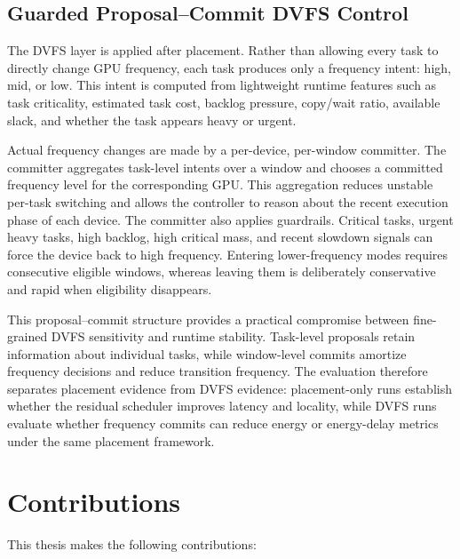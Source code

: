 \subsection{Guarded Proposal--Commit DVFS Control}

The DVFS layer is applied after placement. Rather than allowing every task to directly change GPU frequency, each task produces only a frequency intent: high, mid, or low. This intent is computed from lightweight runtime features such as task criticality, estimated task cost, backlog pressure, copy/wait ratio, available slack, and whether the task appears heavy or urgent.

Actual frequency changes are made by a per-device, per-window committer. The committer aggregates task-level intents over a window and chooses a committed frequency level for the corresponding GPU. This aggregation reduces unstable per-task switching and allows the controller to reason about the recent execution phase of each device. The committer also applies guardrails. Critical tasks, urgent heavy tasks, high backlog, high critical mass, and recent slowdown signals can force the device back to high frequency. Entering lower-frequency modes requires consecutive eligible windows, whereas leaving them is deliberately conservative and rapid when eligibility disappears.

This proposal--commit structure provides a practical compromise between fine-grained DVFS sensitivity and runtime stability. Task-level proposals retain information about individual tasks, while window-level commits amortize frequency decisions and reduce transition frequency. The evaluation therefore separates placement evidence from DVFS evidence: placement-only runs establish whether the residual scheduler improves latency and locality, while DVFS runs evaluate whether frequency commits can reduce energy or energy-delay metrics under the same placement framework.

\section{Contributions}

This thesis makes the following contributions:

